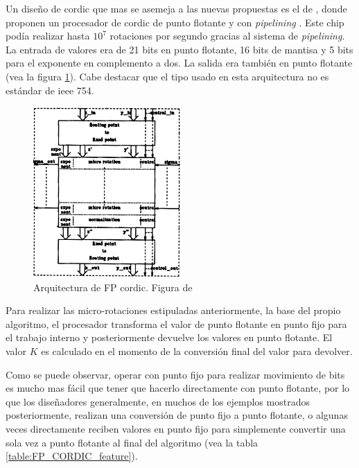 Un diseño de \gls{cordic} que mas se asemeja a las nuevas propuestas es el de \cite{de_lange_optimal_1988}, donde proponen un procesador de \gls{cordic} de punto flotante y con \textit{pipelining} . Este chip podía realizar hasta $10^7$ rotaciones por segundo gracias al sistema de \textit{pipelining}. La entrada de valores era de 21 bits en punto flotante, 16 bits de mantisa y 5 bits para el exponente en complemento a dos. La salida era también en punto flotante (vea la figura \ref{graf:Arq_FP_CORDIC}). Cabe destacar que el tipo usado en esta arquitectura no es estándar de \gls{ieee} 754.

\begin{figure}[ht]
	\centering
	\includegraphics[width=0.5\textwidth]{archivos/CORDIC/1988_FP_CORDIC_Architecture.png}
	\caption{Arquitectura de FP \gls{cordic}. Figura de \cite{de_lange_optimal_1988}}
	\label{graf:Arq_FP_CORDIC}
\end{figure}

Para realizar las micro-rotaciones estipuladas anteriormente, la base del propio algoritmo, el procesador transforma el valor de punto flotante en punto fijo para el trabajo interno y posteriormente devuelve los valores en punto flotante. El valor $K$ es calculado en el momento de la conversión final del valor para devolver.

Como se puede observar, operar con punto fijo para realizar movimiento de bits es mucho mas fácil que tener que hacerlo directamente con punto flotante, por lo que los diseñadores generalmente, en muchos de los ejemplos mostrados posteriormente, realizan una conversión de punto fijo a punto flotante, o algunas veces directamente reciben valores en punto fijo para simplemente convertir una sola vez a punto flotante al final del algoritmo (vea la tabla \ref{table:FP_CORDIC_feature}).

